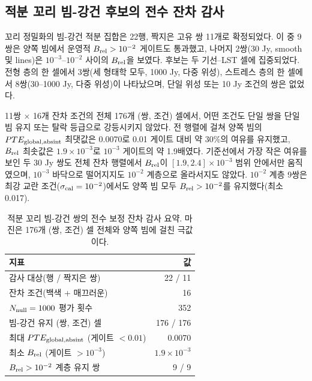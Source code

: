 \documentclass[final,5p,times]{elsarticle}
\newcommand{\NNullTail}{1000}
\newcommand{\NIntTailBeamRobustEthree}{22}
\newcommand{\NIntAuditPairs}{11}
\newcommand{\NIntAuditPairsEtwo}{9}
\newcommand{\NIntAuditPairsMid}{2}
\newcommand{\NIntAuditConds}{16}
\newcommand{\NIntAuditCells}{176}
\newcommand{\NIntAuditEvals}{352}
\newcommand{\IntAuditMaxPTE}{0.0070}
\newcommand{\IntAuditMinBrel}{1.9\times10^{-3}}
\newcommand{\IntAuditMinBrelEtwo}{0.017}
\newcommand{\NIntAuditPairsTypical}{3}
\newcommand{\NIntAuditPairsStress}{8}
\begin{document}
\subsection{적분 꼬리 빔-강건 후보의 전수 잔차 감사}
\label{sec:results:intaudit}

꼬리 정밀화의 빔-강건 적분 집합은 \NIntTailBeamRobustEthree{}행,
짝지은 고유 쌍 \NIntAuditPairs{}개로 확정되었다. 이 중
\NIntAuditPairsEtwo{}쌍은 양쪽 빔에서 운영적
$B_{\rm rel}>10^{-2}$ 게이트도 통과했고, 나머지
\NIntAuditPairsMid{}쌍(30 Jy, smooth 및 lines)은
$10^{-3}$--$10^{-2}$ 사이의 $B_{\rm rel}$을 보였다. 후보는 두
기선--LST 셀에 집중되었다. 전형 층의 한 셀에서
\NIntAuditPairsTypical{}쌍(세 형태학 모두, 1000 Jy, 다중 위성),
스트레스 층의 한 셀에서 \NIntAuditPairsStress{}쌍(30--1000 Jy,
다중 위성)이 나타났으며, 단일 위성 또는 10 Jy 조건의 쌍은 없었다.

\NIntAuditPairs{}쌍 $\times$ \NIntAuditConds{}개 잔차 조건의 전체
\NIntAuditCells{}개 (쌍, 조건) 셀에서, 어떤 조건도 단일 쌍을 단일
빔 유지 또는 탈락 등급으로 강등시키지 않았다. 전 행렬에 걸쳐 양쪽
빔의 $PTE_{\rm global,absint}$ 최댓값은 \IntAuditMaxPTE{}로 0.01
게이트 대비 약 30\%의 여유를 유지했고, $B_{\rm rel}$ 최솟값은
$\IntAuditMinBrel$로 $10^{-3}$ 게이트의 약 1.9배였다. 기준선에서
가장 작은 여유를 보인 두 30 Jy 쌍도 전체 잔차 행렬에서
$B_{\rm rel}$이 $[1.9,2.4]\times10^{-3}$ 범위 안에서만 움직였으며,
$10^{-3}$ 바닥으로 떨어지지도 $10^{-2}$ 계층으로 올라서지도
않았다. $10^{-2}$ 계층 \NIntAuditPairsEtwo{}쌍은 최강 교란
조건($\sigma_{\rm cal}=10^{-2}$)에서도 양쪽 빔 모두
$B_{\rm rel}>10^{-2}$를 유지했다(최소 \IntAuditMinBrelEtwo{}).

\begin{table}[!t]
\centering
\small
\caption{적분 꼬리 빔-강건 쌍의 전수 보정 잔차 감사 요약. 마진은
\NIntAuditCells{}개 (쌍, 조건) 셀 전체와 양쪽 빔에 걸친 극값이다.}
\label{tab:intaudit}
\begin{tabularx}{\linewidth}{Xr}
\toprule
지표 & 값 \\
\midrule
감사 대상(행 / 짝지은 쌍) & \NIntTailBeamRobustEthree{} / \NIntAuditPairs \\
잔차 조건(백색 + 매끄러운) & \NIntAuditConds \\
$N_{\rm null}=\NNullTail$ 평가 횟수 & \NIntAuditEvals \\
빔-강건 유지 (쌍, 조건) 셀 & \NIntAuditCells{} / \NIntAuditCells \\
최대 $PTE_{\rm global,absint}$ (게이트 $<0.01$) & \IntAuditMaxPTE \\
최소 $B_{\rm rel}$ (게이트 $>10^{-3}$) & $\IntAuditMinBrel$ \\
$B_{\rm rel}>10^{-2}$ 계층 유지 쌍 & \NIntAuditPairsEtwo{} / \NIntAuditPairsEtwo \\
\bottomrule
\end{tabularx}
\end{table}
\end{document}
